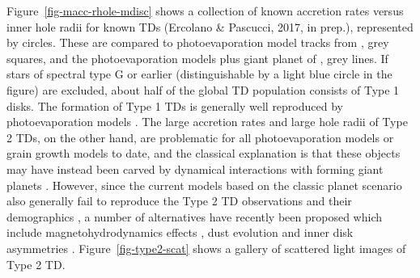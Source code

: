 \documentclass[10pt,fleqn,twoside,a4paper]{article}
\begin{document}
Figure~\ref{fig-macc-rhole-mdisc} shows a collection of known accretion rates versus inner hole
radii for known TDs (Ercolano \& Pascucci, 2017, in prep.),
represented by circles. These are compared to photoevaporation model tracks from
\citet{2011MNRAS.412...13O}, grey squares, and the photoevaporation models plus giant planet
of \citet{2013MNRAS.430.1392R, 2015MNRAS.454.2173R}, grey lines. 
If stars of spectral type G or earlier (distinguishable by a light
blue circle in the figure) are excluded, about half of the global TD population consists of Type 1
disks. The formation of Type 1 TDs is generally well reproduced by
photoevaporation models \citep[e.g.,][]{2010MNRAS.401.1415O, 2011MNRAS.412...13O}.
The large accretion rates and large hole
radii of Type 2 TDs, on the other hand, are problematic for all 
photoevaporation models \citep[e.g.,][]{2013MNRAS.430.1392R, 2015MNRAS.454.2173R}
or grain
growth models \citep{2012A&A...544A..79B} to date, and the classical explanation is that
these objects may have instead been carved by dynamical interactions
with forming giant planets \citep[e.g.,][]{2011ApJ...729...47Z}. However, since the
current models based on the classic planet scenario also generally
fail to reproduce the Type 2 TD observations and 
their demographics \citep[see e.g.,][]{2016ApJ...825...77D},
a number of alternatives have recently been proposed which include magnetohydrodynamics
effects \citep[e.e.,][]{2016arXiv160907510W}, dust evolution 
\citep{2016A&A...585A..35P} and inner disk asymmetries \citep{2016ApJ...823L...8M}.
Figure~\ref{fig-type2-scat} shows a gallery of scattered light images of Type 2 TD.
\end{document}
